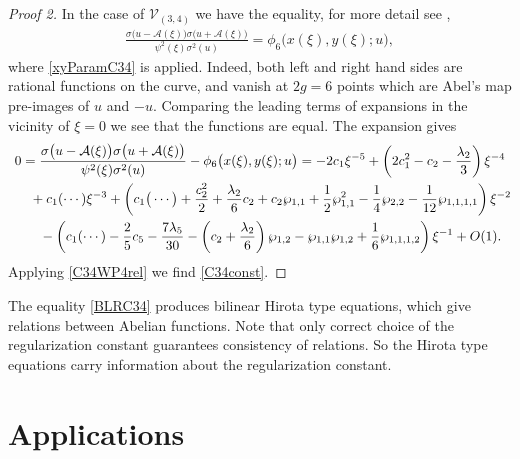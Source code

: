 \documentclass[pdftex]{sigma}
\numberwithin{equation}{section}
\begin{document}
\begin{proof}[Proof 2]
In the case of $\mathcal{V}_{(3,4)}$ we have the equality, for more detail see \cite{BL2005},
\begin{gather}\label{BLRC34}
 \frac{\sigma\big(u-\mathcal{A}(\xi)\big)\sigma\big(u+\mathcal{A}(\xi)\big)} {\psi^2(\xi)\sigma^2(u)} = \phi_{6}\big(x(\xi),y(\xi);u\big),
\end{gather}
where \eqref{xyParamC34} is applied. Indeed, both left and right hand sides are rational functions on the curve, and vanish at $2g=6$ points which are Abel's map pre-images of $u$ and $-u$. Comparing the leading terms of expansions in the vicinity of $\xi=0$ we see that the functions are equal. The expansion gives
\begin{gather*}
 0= \frac{\sigma\big(u-\mathcal{A}(\xi)\big)\sigma\big(u+\mathcal{A}(\xi)\big)}
 {\psi^2(\xi)\sigma^2(u)} - \phi_{6}\big(x(\xi),y(\xi);u\big)= -2 c_1 \xi^{-5}
 + \left(2c_1^2 - c_2 -\frac{\lambda_2}{3}\right)\xi^{-4}
\\ \hphantom{0=}{} + c_1 (\cdots) \xi^{-3}+
 \left(c_1 \big(\cdots \big) + \frac{c_2^2}{2} + \frac{\lambda_2}{6} c_2 + c_2 \wp_{1,1}
 + \frac{1}{2}\wp_{1,1}^2 -\frac{1}{4}\wp_{2,2} -\frac{1}{12}\wp_{1,1,1,1} \right)\xi^{-2}
 \\ \hphantom{0=}{} - \left(c_1 (\cdots ) - \frac{2}{5}c_5
 -\frac{7\lambda_5}{30} - \left(c_2 + \frac{\lambda_2}{6}\right) \wp_{1,2}
 - \wp_{1,1} \wp_{1,2} + \frac{1}{6}\wp_{1,1,1,2}\right)\xi^{-1} + O(1).
\end{gather*}
Applying \eqref{C34WP4rel} we find \eqref{C34const}.
\end{proof}

\begin{Remark}The equality \eqref{BLRC34} produces bilinear Hirota type equations, which give relations between Abelian functions. Note that
only correct choice of the regularization constant guarantees consistency of relations. So the Hirota type equations carry information about the regularization constant.
\end{Remark}

\section{Applications}
\end{document}
